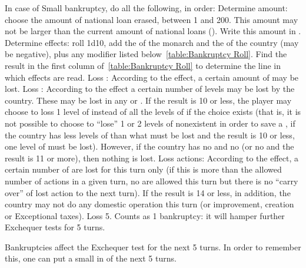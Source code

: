  In case of Small bankruptcy, do all the following,
in order:
\bparag Determine amount: choose the amount of national loan erased, between 1
and 200\ducats. This amount may not be larger than the current amount of
national loans (). Write this amount in
.
\bparag Determine effects: roll 1d10, add the \ADM of the monarch and the
\STAB of the country (may be negative), plus any modifier listed
below~\ref{table:Bankruptcy Roll}. Find the result in the first column
of~\ref{table:Bankruptcy Roll} to determine the line in which effects are
read.
\bparag Loss \STAB: According to the effect, a certain amount of \STAB may be
lost.
\bparag Loss \TradeFLEET: According to the effect a certain number of
\TradeFLEET levels may be lost by the country. These may be lost in any \STZ
or \CTZ. If the result is 10 or less, the player may choose to loss 1 level of
\MNU instead of all the levels of \TradeFLEET if the choice exists (that is,
it is not possible to choose to ``lose'' 1 or 2 levels of nonexistent
\TradeFLEET in order to save a \MNU, if the country has less levels of
\TradeFLEET than what must be lost and the result is 10 or less, one level of
\MNU must be lost). However, if the country has no \TradeFLEET and no \MNU (or
no \TradeFLEET and the result is 11 or more), then nothing is lost.
\bparag Loss actions: According to the effect, a certain number of \TFI are
lost for this turn only (if this is more than the allowed number of actions in
a given turn, no \TFI are allowed this turn but there is no ``carry over'' of
lost action to the next turn). If the result is 14 or less, in addition, the
country may not do any domestic operation this turn (\DTI or \FTI improvement,
\MNU creation or Exceptional taxes).
\bparag Loss 5\VPs.
\bparag Counts as 1 bankruptcy: it will hamper further Exchequer tests for 5
turns.

\begin{playtip}
  Bankruptcies affect the Exchequer test for the next 5 turns. In order to
  remember this, one can put a small \textetoile in  of the next 5 turns.
\end{playtip}

